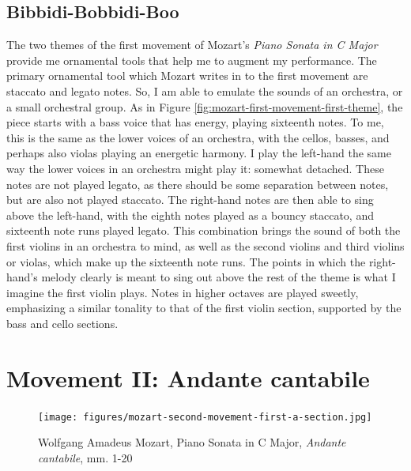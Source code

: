 \subsection{Bibbidi-Bobbidi-Boo}

The two themes of the first movement of Mozart's \textit{Piano Sonata in C Major} provide me ornamental tools that help me to augment my performance. The primary ornamental tool which Mozart writes in to the first movement are staccato and legato notes. So, I am able to emulate the sounds of an orchestra, or a small orchestral group. As in Figure \ref{fig:mozart-first-movement-first-theme}\autocite{Henle_1977}, the piece starts with a bass voice that has energy, playing sixteenth notes. To me, this is the same as the lower voices of an orchestra, with the cellos, basses, and perhaps also violas playing an energetic harmony. I play the left-hand the same way the lower voices in an orchestra might play it: somewhat detached. These notes are not played legato, as there should be some separation between notes, but are also not played staccato. The right-hand notes are then able to sing above the left-hand, with the eighth notes played as a bouncy staccato, and sixteenth note runs played legato. This combination brings the sound of both the first violins in an orchestra to mind, as well as the second violins and third violins or violas, which make up the sixteenth note runs. The points in which the right-hand's melody clearly is meant to sing out above the rest of the theme is what I imagine the first violin plays. Notes in higher octaves are played sweetly, emphasizing a similar tonality to that of the first violin section, supported by the bass and cello sections. 

\section{Movement II: Andante cantabile}

\begin{figure}
    \centering
    \texttt{[image: figures/mozart-second-movement-first-a-section.jpg]}
    \caption{Wolfgang Amadeus Mozart, Piano Sonata in C Major, \textit{Andante cantabile}, mm. 1-20}
    \label{fig:mozart-second-movement-first-a-section}
\end{figure}

